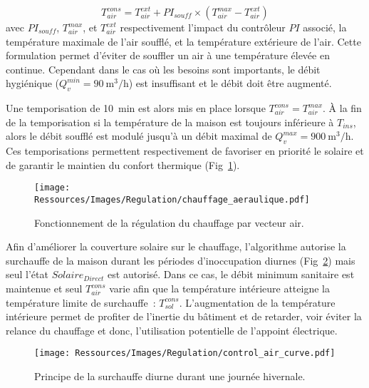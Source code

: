\begin{equation}\label{eq:temp_soufflage}
    T_{air}^{cons} = T_{air}^{ext} + PI_{souff} \times (T_{air}^{max} - T_{air}^{ext})
\end{equation}
avec $PI_{souff}$, $T_{air}^{max}$, et $T_{air}^{ext}$ respectivement l’impact du
contrôleur $PI$ associé, la température maximale de l’air soufflé, et la température
extérieure de l’air. Cette formulation permet d’éviter de souffler un air à une
température élevée en continue. Cependant dans le cas où les besoins sont importants, le
débit hygiénique ($Q_{v}^{min} = \SI[per-mode=symbol]{90}{\meter\cubed\per\hour}$) est insuffisant
et le débit doit être augmenté.

Une temporisation de \SI{10}{min} est alors mis en place lorsque $T_{air}^{cons} = T_{air}^{max}$.
À la fin de la temporisation si la température de la maison est
toujours inférieure à $T_{ins}$, alors le débit soufflé est modulé jusqu’à un débit maximal de
$Q_{v}^{max} = \SI[per-mode=symbol]{900}{\meter\cubed\per\hour}$. Ces
temporisations permettent respectivement de favoriser en priorité le solaire et de
garantir le maintien du confort thermique (Fig~\ref{fig:chauffage_aeraulique}).

\begin{figure}
    \begin{center}
        \texttt{[image: Ressources/Images/Regulation/chauffage\_aeraulique.pdf]}
    \end{center}
    \caption{Fonctionnement de la régulation du chauffage par vecteur air.
             \label{fig:chauffage_aeraulique}}
\end{figure}

Afin d’améliorer la couverture solaire sur le chauffage, l’algorithme autorise la
surchauffe de la maison durant les périodes d’inoccupation diurnes
(Fig~\ref{fig:control_air}) mais seul l’état $Solaire_{Direct}$ est autorisé. Dans ce
cas, le débit minimum sanitaire est maintenue et seul $T_{air}^{cons}$ varie afin que la
température intérieure atteigne la température limite de surchauffe~: $T^{cons}_{sol}$.
L’augmentation de la température intérieure permet de profiter de l’inertie du bâtiment et
de retarder, voir éviter la relance du chauffage et donc, l’utilisation potentielle de
l’appoint électrique.
\begin{figure}
    \begin{center}
        \texttt{[image: Ressources/Images/Regulation/control\_air\_curve.pdf]}
    \end{center}
    \caption{Principe de la surchauffe diurne durant une journée hivernale.
             \label{fig:control_air}}
\end{figure}








